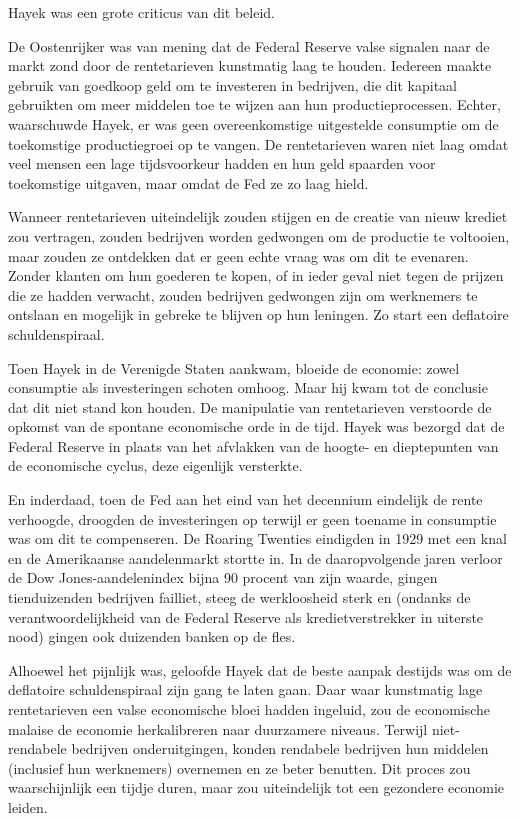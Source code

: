 \documentclass[
  a5paper,
  smalldemyvopaper,11pt,twoside,onecolumn,openright,extrafontsizes,
hidelinks]{memoir}
\begin{document}
Hayek was een grote criticus van dit beleid.

De Oostenrijker was van mening dat de Federal Reserve valse signalen
naar de markt zond door de rentetarieven kunstmatig laag te houden.
Iedereen maakte gebruik van goedkoop geld om te investeren in bedrijven,
die dit kapitaal gebruikten om meer middelen toe te wijzen aan hun
productieprocessen. Echter, waarschuwde Hayek, er was geen
overeenkomstige uitgestelde consumptie om de toekomstige productiegroei
op te vangen. De rentetarieven waren niet laag omdat veel mensen een
lage tijdsvoorkeur hadden en hun geld spaarden voor toekomstige
uitgaven, maar omdat de Fed ze zo laag hield.

Wanneer rentetarieven uiteindelijk zouden stijgen en de creatie van
nieuw krediet zou vertragen, zouden bedrijven worden gedwongen om de
productie te voltooien, maar zouden ze ontdekken dat er geen echte vraag
was om dit te evenaren. Zonder klanten om hun goederen te kopen, of in
ieder geval niet tegen de prijzen die ze hadden verwacht, zouden
bedrijven gedwongen zijn om werknemers te ontslaan en mogelijk in
gebreke te blijven op hun leningen. Zo start een deflatoire
schuldenspiraal.

Toen Hayek in de Verenigde Staten aankwam, bloeide de economie: zowel
consumptie als investeringen schoten omhoog. Maar hij kwam tot de
conclusie dat dit niet stand kon houden. De manipulatie van
rentetarieven verstoorde de opkomst van de spontane economische orde in
de tijd. Hayek was bezorgd dat de Federal Reserve in plaats van het
afvlakken van de hoogte- en dieptepunten van de economische cyclus, deze
eigenlijk versterkte.

En inderdaad, toen de Fed aan het eind van het decennium eindelijk de
rente verhoogde, droogden de investeringen op terwijl er geen toename in
consumptie was om dit te compenseren. De Roaring Twenties eindigden in
1929 met een knal en de Amerikaanse aandelenmarkt stortte in. In de
daaropvolgende jaren verloor de Dow Jones-aandelenindex bijna 90 procent
van zijn waarde, gingen tienduizenden bedrijven failliet, steeg de
werkloosheid sterk en (ondanks de verantwoordelijkheid van de Federal
Reserve als kredietverstrekker in uiterste nood) gingen ook duizenden
banken op de fles.

Alhoewel het pijnlijk was, geloofde Hayek dat de beste aanpak destijds
was om de deflatoire schuldenspiraal zijn gang te laten gaan. Daar waar
kunstmatig lage rentetarieven een valse economische bloei hadden
ingeluid, zou de economische malaise de economie herkalibreren naar
duurzamere niveaus. Terwijl niet-rendabele bedrijven onderuitgingen,
konden rendabele bedrijven hun middelen (inclusief hun werknemers)
overnemen en ze beter benutten. Dit proces zou waarschijnlijk een tijdje
duren, maar zou uiteindelijk tot een gezondere economie leiden.
\end{document}
